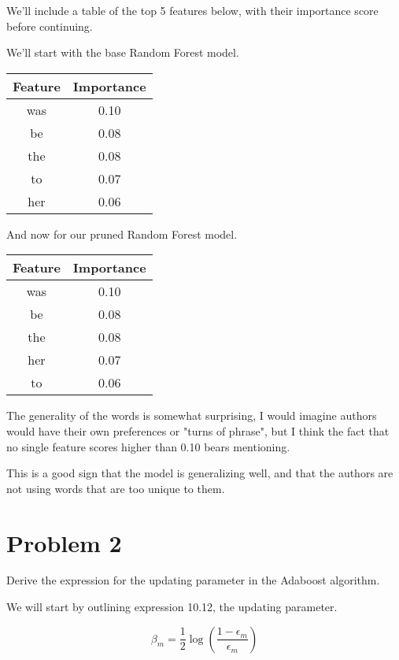 \documentclass[12pt, letterpaper]{article}
\begin{document}
We'll include a table of the top 5 features below, with their importance score before continuing. 

We'll start with the base Random Forest model. 

\begin{center}
\begin{tabular}{|c|c|} 
\hline 
Feature & Importance \\ 
\hline 
  was & 0.10 \\ 
  be & 0.08 \\ 
  the & 0.08 \\ 
  to & 0.07 \\ 
  her & 0.06 \\ 
  \hline 
\end{tabular} 
\end{center} 

And now for our pruned Random Forest model. 

\begin{center}
  \begin{tabular}{|c|c|}
\hline 
    Feature & Importance \\
    \hline 
    was & 0.10 \\ 
    be & 0.08 \\ 
    the & 0.08 \\ 
    her & 0.07 \\ 
    to & 0.06 \\
    \hline 
  \end{tabular}
\end{center}

The generality of the words is somewhat surprising, I would imagine authors would have their own preferences or "turns of phrase", but I think the fact that no single feature scores higher than 0.10 bears mentioning. 

This is a good sign that the model is generalizing well, and that the authors are not using words that are too unique to them. 

\section{Problem 2}

Derive the expression for the updating parameter in the Adaboost algorithm. 

We will start by outlining expression 10.12, the updating parameter. 

\[
   \beta_m = \frac{1}{2} \log \left( \frac{1 - \epsilon_m}{\epsilon_m} \right)
\]
\end{document}
